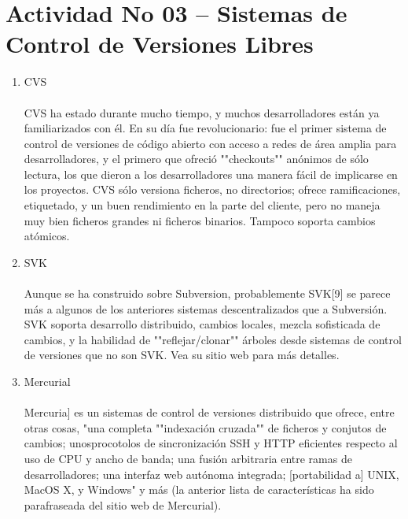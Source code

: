 \section{Actividad No 03 – Sistemas de Control de Versiones Libres} 
		
\begin{enumerate}[1.]
	\item CVS
	\\
	\\CVS ha estado durante mucho tiempo, y muchos desarrolladores están ya familiarizados con él. En su día fue revolucionario: fue el primer sistema de control de versiones de código abierto con acceso a redes de área amplia para desarrolladores, y el primero que ofreció ""checkouts"" anónimos de sólo lectura, los que dieron a los desarrolladores una manera fácil de implicarse en los proyectos. CVS sólo versiona ficheros, no directorios; ofrece ramificaciones, etiquetado, y un buen rendimiento en la parte del cliente, pero no maneja muy bien ficheros grandes ni ficheros binarios. Tampoco soporta cambios atómicos.
	

	\item SVK
	\\
	\\Aunque se ha construido sobre Subversion, probablemente SVK[9] se parece más a algunos de los anteriores sistemas descentralizados que a Subversión. SVK soporta desarrollo distribuido, cambios locales, mezcla sofisticada de cambios, y la habilidad de ""reflejar/clonar"" árboles desde sistemas de control de versiones que no son SVK. Vea su sitio web para más detalles.
	

	\item Mercurial
	\\
	\\Mercuria] es un sistemas de control de versiones distribuido que ofrece, entre otras cosas, "una completa ""indexación cruzada"" de ficheros y conjutos de cambios; unosprocotolos de sincronización SSH y HTTP eficientes respecto al uso de CPU y ancho de banda; una fusión arbitraria entre ramas de desarrolladores; una interfaz web autónoma integrada; [portabilidad a] UNIX, MacOS X, y Windows" y más (la anterior lista de características ha sido parafraseada del sitio web de Mercurial).
	


\end{enumerate}

